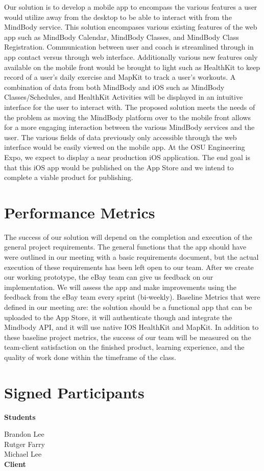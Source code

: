 \documentclass[letterpaper,10pt,titlepage]{article}
\begin{document}
Our solution is to develop a mobile app to encompass the various features a user would utilize away from the desktop to be able to interact with from the MindBody service. This solution encompases various existing features of the web app such as MindBody Calendar, MindBody Classes, and MindBody Class Registration. Communication between user and coach is streamlined through in app contact versus through web interface. Additionally various new features only available on the mobile front would be brought to light such as HealthKit to keep record of a user's daily exercise and MapKit to track a user's workouts. A combination of data from both MindBody and iOS such as MindBody Classes/Schedules, and HealthKit Activities will be displayed in an intuitive interface for the user to interact with. The proposed solution meets the needs of the problem as moving the MindBody platform over to the mobile front allows for a more engaging interaction between the various MindBody services and the user. The various fields of data previously only accessible through the web interface would be easily viewed on the mobile app. At the OSU Engineering Expo, we expect to display a near production iOS application. The end goal is that this iOS app would be published on the App Store and we intend to complete a viable product for publishing.

\section{Performance Metrics}

The success of our solution will depend on the completion and execution of the general project requirements. The general functions that the app should have were outlined in our meeting with a basic requirements document, but the actual execution of these requirements has been left open to our team. After we create our working prototype, the eBay team can give us feedback on our implementation. We will assess the app and make improvements using the feedback from the eBay team every sprint (bi-weekly). Baseline Metrics that were defined in our meeting are: the solution should be a functional app that can be uploaded to the App Store, it will authenticate though and integrate the Mindbody API, and it will use native IOS HealthKit and MapKit. In addition to these baseline project metrics, the success of our team will be measured on the team-client satisfaction on the finished product, learning experience, and the quality of work done within the timeframe of the class.

\newpage

\section{Signed Participants}

\textbf{Students}

Brandon Lee\\
Rutger Farry\\
Michael Lee\\

\textbf{Client}
\end{document}
